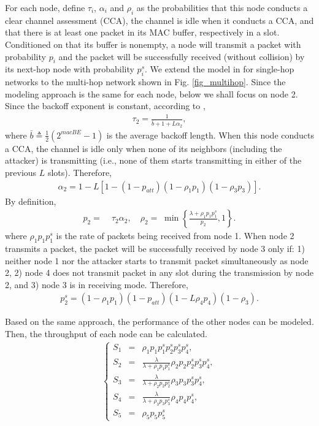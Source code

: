 \documentclass[10pt,journal,cspaper,compsoc]{IEEEtran}
\begin{document}
For each node, define $\tau_i$, $\alpha_i$ and $\rho_i$ as the probabilities that this node conducts a clear channel assessment (CCA), the channel is idle when it conducts a CCA, and that there is at least one packet in its MAC buffer, respectively in a slot. Conditioned on that its buffer is nonempty, a node will transmit a packet with probability $p_i$ and the packet will be successfully received (without collision) by its next-hop node with probability $p^s_i$. We extend the model in \cite{ling2008renewal} for single-hop networks to the multi-hop network shown in Fig. \ref{fig_multihop}. Since the modeling approach is the same for each node, below we shall focus on node 2. Since the backoff exponent is constant, according to \cite{ling2008renewal},
\begin{align}
    \tau_2 = \frac{1}{\bar{b}+1+L\alpha_2},
\end{align}
where $\bar{b}\triangleq\frac{1}{2}(2^{macBE}-1)$ is the average backoff length. When this node conducts a CCA, the channel is idle only when none of its neighbors (including the attacker) is transmitting (i.e., none of them starts transmitting in either of the previous $L$ slots). Therefore,
\begin{align}
\alpha_2 = 1-L\left[1-(1-p_{att})(1-\rho_1p_1)(1-\rho_3p_3)\right].
\end{align}
By definition,
\begin{align}
    p_2=\;&\tau_2\alpha_2, \quad \rho_2 =\; \min\left\{\frac{\lambda+\rho_1p_1p^s_1}{p_2},1\right\}.
\end{align}
where $\rho_1p_1p^s_1$ is the rate of packets being received from node 1. When node 2 transmits a packet, the packet will be successfully received by node 3 only if: 1) neither node 1 nor the attacker starts to transmit packet simultaneously as node 2, 2) node 4 does not transmit packet in any slot during the transmission by node 2, and 3) node 3 is in receiving mode. Therefore,
\begin{align}
p^s_2 = (1-\rho_1p_1)(1-p_{att})(1-L\rho_4p_4)(1-\rho_3).
\end{align}

Based on the same approach, the performance of the other nodes can be modeled. Then, the throughput of each node can be calculated.
\begin{align}
\left\{\begin{array}{lcl}
    S_1 &=& \rho_1p_1p^s_1p^s_2p^s_3p^s_4,\\
    S_2 &=& \frac{\lambda}{\lambda+\rho_1p_1p^s_1}\rho_2p_2p^s_2p^s_3p^s_4,\\
    S_3 &=& \frac{\lambda}{\lambda+\rho_2p_2p^s_2}\rho_3p_3p^s_3p^s_4,\\
    S_4 &=& \frac{\lambda}{\lambda+\rho_3p_3p^s_3}\rho_4p_4p^s_4,\\
    S_5 &=& \rho_5p_5p^s_5
\end{array}\right.
\end{align}
\end{document}
